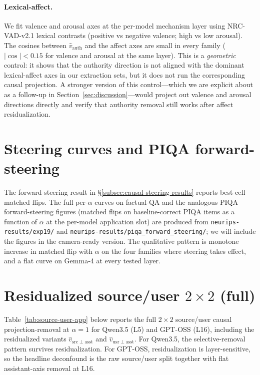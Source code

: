 \documentclass{article}
\begin{document}
\paragraph{Lexical-affect.}
We fit valence and arousal axes at the per-model mechanism layer using NRC-VAD-v2.1 lexical contrasts (positive vs negative valence; high vs low arousal). The cosines between $\hat{v}_{\mathrm{auth}}$ and the affect axes are small in every family ($|\cos| < 0.15$ for valence and arousal at the same layer). This is a \emph{geometric} control: it shows that the authority direction is not aligned with the dominant lexical-affect axes in our extraction sets, but it does not run the corresponding causal projection. A stronger version of this control---which we are explicit about as a follow-up in Section~\ref{sec:discussion}---would project out valence and arousal directions directly and verify that authority removal still works after affect residualization.

\section{Steering curves and PIQA forward-steering}
\label{app:steering-curves}

The forward-steering result in §\ref{subsec:causal-steering-results} reports best-cell matched flips. The full per-$\alpha$ curves on factual-QA and the analogous PIQA forward-steering figures (matched flips on baseline-correct PIQA items as a function of $\alpha$ at the per-model application slot) are produced from \texttt{neurips-results/exp19/} and \texttt{neurips-results/piqa\_forward\_steering/}; we will include the figures in the camera-ready version. The qualitative pattern is monotone increase in matched flip with $\alpha$ on the four families where steering takes effect, and a flat curve on Gemma-4 at every tested layer.

\section{Residualized source/user $2{\times}2$ (full)}
\label{app:residualized-2x2}

Table~\ref{tab:source-user-app} below reports the full $2{\times}2$ source/user causal projection-removal at $\alpha=1$ for Qwen3.5 (L5) and GPT-OSS (L16), including the residualized variants $\hat{v}_{\mathrm{src}\perp\mathrm{asst}}$ and $\hat{v}_{\mathrm{usr}\perp\mathrm{asst}}$. For Qwen3.5, the selective-removal pattern survives residualization. For GPT-OSS, residualization is layer-sensitive, so the headline deconfound is the raw source/user split together with flat assistant-axis removal at L16.
\end{document}
